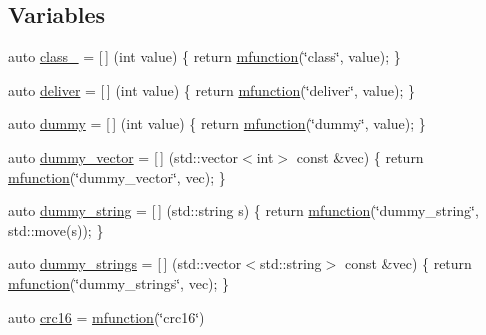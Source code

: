 \subsection*{Variables}
\begin{DoxyCompactItemize}
\item 
auto \hyperlink{namespacepfq_1_1lang_1_1experimental_1_1anonymous__namespace_02experimental_8hpp_03_a55ce0b220b42a47460d1d40d3d5fdd5d}{class\+\_\+} = \mbox{[}$\,$\mbox{]} (int value) \{ return \hyperlink{namespacepfq_1_1lang_a1aacba4a159b6c2ddf275bd1fec19ec2}{mfunction}(\char`\"{}class\char`\"{}, value); \}
\item 
auto \hyperlink{namespacepfq_1_1lang_1_1experimental_1_1anonymous__namespace_02experimental_8hpp_03_aabd600ebf1ee62184fa0765f49f9f990}{deliver} = \mbox{[}$\,$\mbox{]} (int value) \{ return \hyperlink{namespacepfq_1_1lang_a1aacba4a159b6c2ddf275bd1fec19ec2}{mfunction}(\char`\"{}deliver\char`\"{}, value); \}
\item 
auto \hyperlink{namespacepfq_1_1lang_1_1experimental_1_1anonymous__namespace_02experimental_8hpp_03_a5fc8274e9598b8524f833264174b62b7}{dummy} = \mbox{[}$\,$\mbox{]} (int value) \{ return \hyperlink{namespacepfq_1_1lang_a1aacba4a159b6c2ddf275bd1fec19ec2}{mfunction}(\char`\"{}dummy\char`\"{}, value); \}
\item 
auto \hyperlink{namespacepfq_1_1lang_1_1experimental_1_1anonymous__namespace_02experimental_8hpp_03_a8ee61246090fb5d74e96dbb7f19b7008}{dummy\+\_\+vector} = \mbox{[}$\,$\mbox{]} (std\+::vector$<$int$>$ const \&vec) \{ return \hyperlink{namespacepfq_1_1lang_a1aacba4a159b6c2ddf275bd1fec19ec2}{mfunction}(\char`\"{}dummy\+\_\+vector\char`\"{}, vec); \}
\item 
auto \hyperlink{namespacepfq_1_1lang_1_1experimental_1_1anonymous__namespace_02experimental_8hpp_03_a354cb0bfb9d9033e9d87f03fba7c7267}{dummy\+\_\+string} = \mbox{[}$\,$\mbox{]} (std\+::string s) \{ return \hyperlink{namespacepfq_1_1lang_a1aacba4a159b6c2ddf275bd1fec19ec2}{mfunction}(\char`\"{}dummy\+\_\+string\char`\"{}, std\+::move(s)); \}
\item 
auto \hyperlink{namespacepfq_1_1lang_1_1experimental_1_1anonymous__namespace_02experimental_8hpp_03_af6c041f2494f9dd06acb73d42524e3ad}{dummy\+\_\+strings} = \mbox{[}$\,$\mbox{]} (std\+::vector$<$std\+::string$>$ const \&vec) \{ return \hyperlink{namespacepfq_1_1lang_a1aacba4a159b6c2ddf275bd1fec19ec2}{mfunction}(\char`\"{}dummy\+\_\+strings\char`\"{}, vec); \}
\item 
auto \hyperlink{namespacepfq_1_1lang_1_1experimental_1_1anonymous__namespace_02experimental_8hpp_03_a8152d34c5c69cc26aaa2b4a14ed37af1}{crc16} = \hyperlink{namespacepfq_1_1lang_a1aacba4a159b6c2ddf275bd1fec19ec2}{mfunction}(\char`\"{}crc16\char`\"{})

\end{DoxyCompactItemize}
